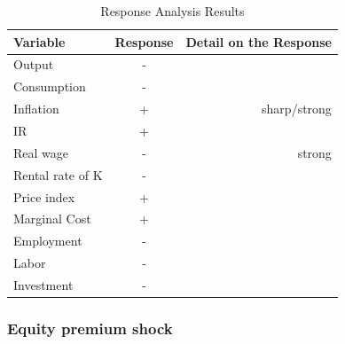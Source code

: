 \documentclass{article}
\begin{document}
\begin{table}[H]    
    \centering  
    \begin{threeparttable}    
    \caption{Response Analysis Results}    
    \label{tab:response_analysis}    
    \begin{tabular}{lcr}    
        \toprule    
        \textbf{Variable} & \textbf{Response} & \textbf{Detail on the Response} \\    
        \midrule    
        Output & - &  \\    
        Consumption & - &  \\  
        Inflation & + & sharp/strong\\  
        IR & + & \\  
        Real wage & - & strong \\  
        Rental rate of K & - & \\
        Price index & + & \\
        Marginal Cost & + &  \\
        Employment & - &  \\   
        Labor & - & \\
        Investment & - & \\
        \bottomrule    
    \end{tabular}  
    \end{threeparttable}    
\end{table} 

\subsubsection{Equity premium shock}
\end{document}
